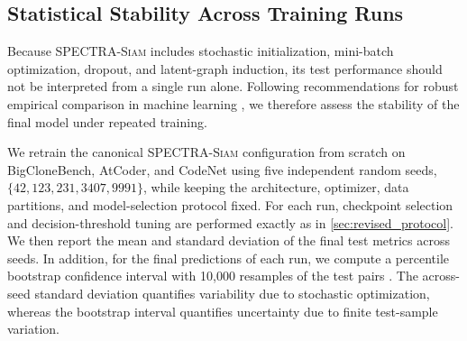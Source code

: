 \documentclass[final,5p,times,twocolumn]{elsarticle}
\newcommand{\method}{\textsc{SPECTRA-Siam}}
\theoremstyle{plain}
\begin{document}
\subsection{Statistical Stability Across Training Runs}
\label{sec:d3_statistical_stability}

Because \method{} includes stochastic initialization, mini-batch optimization, dropout, and latent-graph induction, its test performance should not be interpreted from a single run alone. Following recommendations for robust empirical comparison in machine learning \cite{dietterich1998approximate,demvsar2006statistical,dror2018hitchhikers,reimers2017reporting}, we therefore assess the stability of the final model under repeated training.

We retrain the canonical \method{} configuration from scratch on BigCloneBench, AtCoder, and CodeNet using five independent random seeds, $\{42,123,231,3407,9991\}$, while keeping the architecture, optimizer, data partitions, and model-selection protocol fixed. For each run, checkpoint selection and decision-threshold tuning are performed exactly as in \autoref{sec:revised_protocol}. We then report the mean and standard deviation of the final test metrics across seeds. In addition, for the final predictions of each run, we compute a percentile bootstrap confidence interval with 10,000 resamples of the test pairs \cite{efron1994introduction}. The across-seed standard deviation quantifies variability due to stochastic optimization, whereas the bootstrap interval quantifies uncertainty due to finite test-sample variation.
\end{document}
